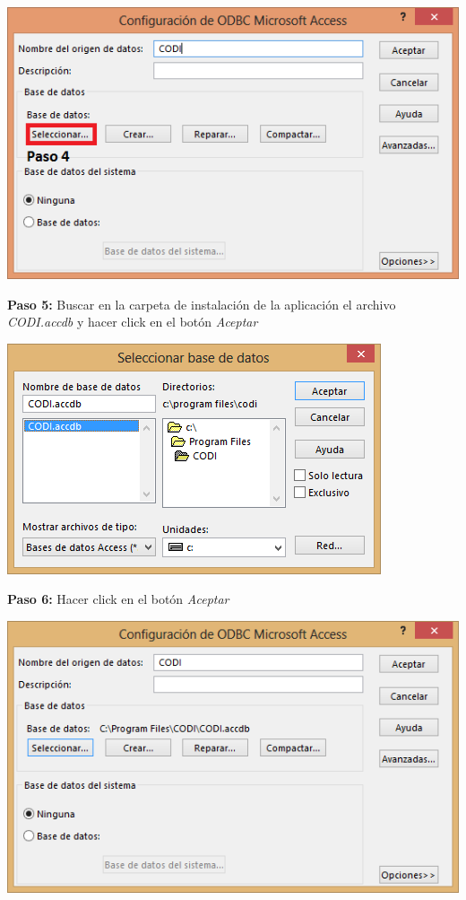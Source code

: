 \documentclass[12pt]{article}
\begin{document}
	\begin{center}
		\includegraphics{Paso4}
	\end{center}
	\newpage
	\large \textbf{Paso 5:} Buscar en la carpeta de instalación de la aplicación el archivo \textit{CODI.accdb} y hacer click en el botón \textit{Aceptar}
	\begin{center}
		\includegraphics{Paso5}
	\end{center}
	\large \textbf{Paso 6:} Hacer click en el botón \textit{Aceptar}
	\begin{center}
		\includegraphics{Paso6}
	\end{center}
\end{document}
